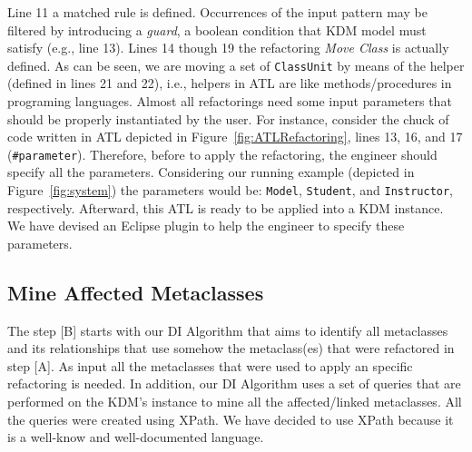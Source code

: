 
Line 11 a matched rule is defined. %
Occurrences of the input pattern may be filtered by introducing a \textit{guard}, a boolean condition that KDM model must satisfy (e.g., line 13). Lines 14 though 19 the refactoring \textit{Move Class} is actually defined. As can be seen, we are moving a set of \texttt{ClassUnit} by means of the helper (defined in lines 21 and 22), i.e., helpers in ATL are like methods/procedures in programing languages. 
Almost all refactorings need some input parameters that should be properly instantiated by the user. For instance, consider the chuck of code written in ATL depicted in Figure~\ref{fig:ATLRefactoring}, lines 13, 16, and 17 (\texttt{\#parameter}). Therefore, before to apply the refactoring, the engineer should specify all the parameters. Considering our running example (depicted in Figure~\ref{fig:system}) the parameters would be: \texttt{Model}, \texttt{Student}, and \texttt{Instructor}, respectively. Afterward, this ATL is ready to be applied into a KDM instance. We have devised an Eclipse plugin to help the engineer to specify these parameters.




\subsection{Mine Affected Metaclasses} %
\label{sub:mine_affected_metaclasses}

The step [B] starts with our DI Algorithm that aims to identify all metaclasses and its relationships that use somehow the metaclass(es) that were refactored in step [A]. As input all the metaclasses that were used to apply an specific refactoring is needed. In addition, our DI Algorithm uses a set of queries that are performed on the KDM's instance to mine all the affected/linked metaclasses. All the queries were created using XPath. We have decided to use XPath because it is a well-know and well-documented language. 

